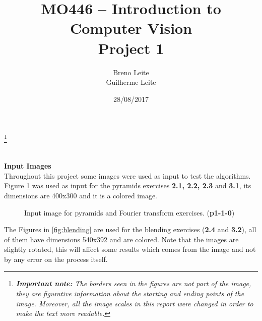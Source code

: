 \documentclass[12pt,a4paper]{article}
\title{MO446 -- Introduction to Computer Vision  \\ Project 1}
\author{Breno Leite  \\ Guilherme Leite}
\date{28/08/2017}
\newcommand\blfootnote[1]{%
	\begingroup
	\renewcommand\thefootnote{}\footnote{#1}%
	\addtocounter{footnote}{-1}%
	\endgroup
}
\begin{document}
\maketitle
\blfootnote{\textit{\textbf{Important note:} The borders seen in the figures are not part of the image, they are figurative information about the starting and ending points of the image. Moreover, all the image scales in this report were changed in order to make the text more readable.}} \\


\textbf{\LARGE Input Images}\\

Throughout this project some images were used as input to test the algorithms. Figure \ref{fig:p1-1-0} was used as input for the pyramids exercises \textbf{2.1, 2.2, 2.3} and \textbf{3.1}, its dimensions are 400x300 and it is a colored image. \\

\begin{figure}[!h]
	\centering
	{%
		\setlength{\fboxsep}{1pt}%
		\setlength{\fboxrule}{1pt}%
	}%
	\caption{Input image for pyramids and Fourier transform exercises. (\textbf{p1-1-0})}
	\label{fig:p1-1-0}
\end{figure}

\newpage

The Figures in \ref{fig:blending} are used for the blending exercises (\textbf{2.4} and \textbf{3.2}), all of them have dimensions 540x392 and are colored. Note that the images are slightly rotated, this will affect some results which comes from the image and not by any error on the process itself. \\
\end{document}
